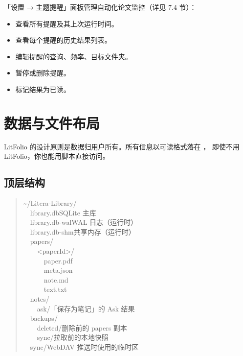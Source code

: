 「设置 → 主题提醒」面板管理自动化论文监控（详见 7.4 节）：

\begin{itemize}
  \item 查看所有提醒及其上次运行时间。
  \item 查看每个提醒的历史结果列表。
  \item 编辑提醒的查询、频率、目标文件夹。
  \item 暂停或删除提醒。
  \item 标记结果为已读。
\end{itemize}

\chapter{数据与文件布局}
\label{ch:data}

LitFolio 的设计原则是数据归用户所有。所有信息以可读格式落在 ，
即使不用 LitFolio，你也能用脚本直接访问。

\section{顶层结构}

\begin{quote}\small\ttfamily
\textasciitilde/Litera-Library/\\
\ \ library.db\hfill\textnormal{\small SQLite 主库}\\
\ \ library.db-wal\hfill\textnormal{\small WAL 日志（运行时）}\\
\ \ library.db-shm\hfill\textnormal{\small 共享内存（运行时）}\\
\ \ papers/\\
\ \ \ \ \textless paperId\textgreater /\\
\ \ \ \ \ \ paper.pdf\\
\ \ \ \ \ \ meta.json\\
\ \ \ \ \ \ note.md\\
\ \ \ \ \ \ text.txt\\
\ \ notes/\\
\ \ \ \ ask/\hfill\textnormal{\small 「保存为笔记」的 Ask 结果}\\
\ \ backups/\\
\ \ \ \ deleted/\hfill\textnormal{\small 删除前的 papers 副本}\\
\ \ \ \ sync/\hfill\textnormal{\small 拉取前的本地快照}\\
\ \ sync/\hfill\textnormal{\small WebDAV 推送时使用的临时区}
\end{quote}

